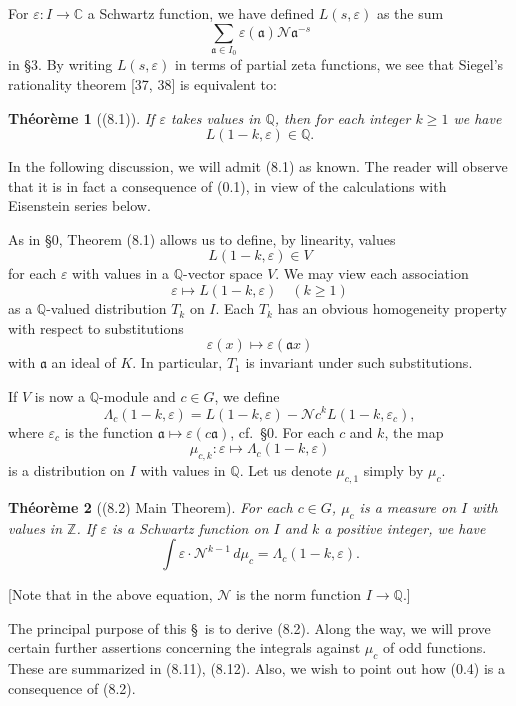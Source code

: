 \documentclass[12pt,a4paper]{article}
\theoremstyle{plain}
\newtheorem{theorem}{Th\'{e}or\`{e}me}[section]
\theoremstyle{definition}
\theoremstyle{remark}
\begin{document}
For $\varepsilon: I \to \mathbb{C}$ a Schwartz function, we have defined $L(s, \varepsilon)$ as the sum
\[
\sum_{\mathfrak{a} \in I_0} \varepsilon(\mathfrak{a}) \mathcal{N}\mathfrak{a}^{-s}
\]
in \S3. By writing $L(s, \varepsilon)$ in terms of partial zeta functions, we see that Siegel's rationality theorem [37, 38] is equivalent to:

\begin{theorem}[(8.1)]\label{thm:8.1}
If $\varepsilon$ takes values in $\mathbb{Q}$, then for each integer $k \ge 1$ we have
\[
L(1-k, \varepsilon) \in \mathbb{Q}.
\]
\end{theorem}

In the following discussion, we will admit (8.1) as known. The reader will observe that it is in fact a consequence of (0.1), in view of the calculations with Eisenstein series below.

As in \S0, Theorem (8.1) allows us to define, by linearity, values
\[
L(1-k, \varepsilon) \in V
\]
for each $\varepsilon$ with values in a $\mathbb{Q}$-vector space $V$. We may view each association
\[
\varepsilon \mapsto L(1-k, \varepsilon) \quad (k \ge 1)
\]
as a $\mathbb{Q}$-valued distribution $T_k$ on $I$. Each $T_k$ has an obvious homogeneity property with respect to substitutions
\[
\varepsilon(x) \mapsto \varepsilon(\mathfrak{a}x)
\]
with $\mathfrak{a}$ an ideal of $K$. In particular, $T_1$ is invariant under such substitutions.

If $V$ is now a $\mathbb{Q}$-module and $c \in G$, we define
\[
\varLambda_c(1-k, \varepsilon) = L(1-k, \varepsilon) - \mathcal{N}c^k L(1-k, \varepsilon_c),
\]
where $\varepsilon_c$ is the function $\mathfrak{a} \mapsto \varepsilon(c\mathfrak{a})$, cf.~\S0. For each $c$ and $k$, the map
\[
\mu_{c,k}: \varepsilon \mapsto \varLambda_c(1-k, \varepsilon)
\]
is a distribution on $I$ with values in $\mathbb{Q}$. Let us denote $\mu_{c,1}$ simply by $\mu_c$.

\begin{theorem}[(8.2) Main Theorem]\label{thm:8.2}
For each $c \in G$, $\mu_c$ is a measure on $I$ with values in $\mathbb{Z}$. If $\varepsilon$ is a Schwartz function on $I$ and $k$ a positive integer, we have
\[
\int \varepsilon \cdot \mathcal{N}^{k-1} \, d\mu_c = \varLambda_c(1-k, \varepsilon).
\]
\end{theorem}

[Note that in the above equation, $\mathcal{N}$ is the norm function $I \to \mathbb{Q}$.]

The principal purpose of this \S\ is to derive (8.2). Along the way, we will prove certain further assertions concerning the integrals against $\mu_c$ of odd functions. These are summarized in (8.11), (8.12). Also, we wish to point out how (0.4) is a consequence of (8.2).
\end{document}
